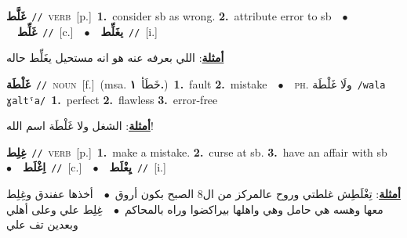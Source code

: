 \documentclass[10pt,a4paper,twoside]{article} %
\begin{document}
\begin{multicols}{2}
{\setlength\topsep{0pt}\textbf{\foreignlanguage{arabic}{غَلَّط}}\ {\color{gray}\texttt{//}\color{black}}\ \textsc{verb}\ [p.]\ \textbf{1.}~consider sb as wrong.  \textbf{2.}~attribute error to sb\ \ $\bullet$\ \ \setlength\topsep{0pt}\textbf{\foreignlanguage{arabic}{غَلِّط}}\ {\color{gray}\texttt{//}\color{black}}\ [c.]\ \ $\bullet$\ \ \setlength\topsep{0pt}\textbf{\foreignlanguage{arabic}{يغَلِّط}}\ {\color{gray}\texttt{//}\color{black}}\ [i.]\  \begin{flushright}\color{gray}\foreignlanguage{arabic}{\textbf{\underline{\foreignlanguage{arabic}{أمثلة}}}: اللي بعرفه عنه هو انه مستحيل يغَلِّط حاله}\end{flushright}\color{black}} \vspace{2mm}

{\setlength\topsep{0pt}\textbf{\foreignlanguage{arabic}{غَلْطَة}}\ {\color{gray}\texttt{//}\color{black}}\ \textsc{noun}\ [f.]\ \color{gray}(msa. \foreignlanguage{arabic}{خَطَأ}~\foreignlanguage{arabic}{\textbf{١.}})\color{black}\ \textbf{1.}~fault  \textbf{2.}~mistake\ \ $\bullet$\ \ \textsc{ph.} \color{gray} \foreignlanguage{arabic}{ولَا غَلْطَة}\color{black}\ {\color{gray}\texttt{/{\sffamily wala ɣaltˤa}/}\color{black}}\ \textbf{1.}~perfect  \textbf{2.}~flawless  \textbf{3.}~error-free\  \begin{flushright}\color{gray}\foreignlanguage{arabic}{\textbf{\underline{\foreignlanguage{arabic}{أمثلة}}}: الشغل ولا غَلْطَة اسم الله!}\end{flushright}\color{black}} \vspace{2mm}

{\setlength\topsep{0pt}\textbf{\foreignlanguage{arabic}{غِلِط}}\ {\color{gray}\texttt{//}\color{black}}\ \textsc{verb}\ [p.]\ \textbf{1.}~make a mistake.  \textbf{2.}~curse at sb.  \textbf{3.}~have an affair with sb\ \ $\bullet$\ \ \setlength\topsep{0pt}\textbf{\foreignlanguage{arabic}{اِغْلَط}}\ {\color{gray}\texttt{//}\color{black}}\ [c.]\ \ $\bullet$\ \ \setlength\topsep{0pt}\textbf{\foreignlanguage{arabic}{يِغْلَط}}\ {\color{gray}\texttt{//}\color{black}}\ [i.]\  \begin{flushright}\color{gray}\foreignlanguage{arabic}{\textbf{\underline{\foreignlanguage{arabic}{أمثلة}}}: تِغْلَطِش غلطتي وروح عالمركز من ال8 الصبح بكون أروق\ $\bullet$\ \  أخذها عفندق وغِلِط معها وهسه هي حامل وهي واهلها بيراكضوا وراه بالمحاكم\ $\bullet$\ \  غِلِط علي وعلى أهلي وبعدين تف علي}\end{flushright}\color{black}} \vspace{2mm}


\end{multicols}
\end{document}

